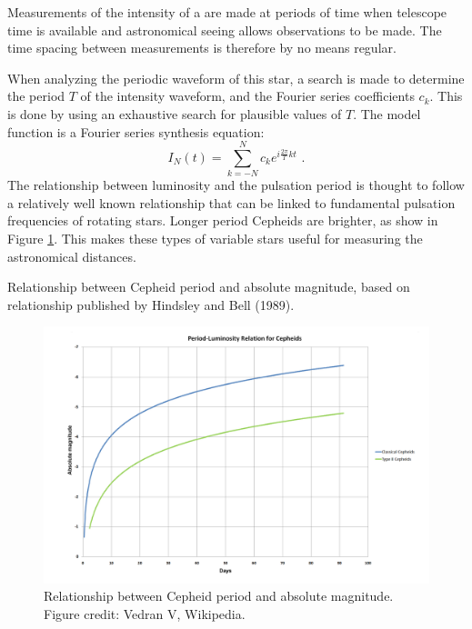 Measurements of the intensity of a \emph{} are made at periods of time when
telescope time is available and astronomical seeing allows
observations to be made. The time spacing between measurements is
therefore by no means regular.

When analyzing the periodic waveform of this star, a search is made to
determine the period $T$ of the intensity waveform, and the Fourier
series coefficients $c_k$. This is done by using an exhaustive search
for plausible values of $T$. The model function is a Fourier series
synthesis equation:
\begin{equation}
I_N(t) = \sum_{k=-N}^N c_k e^{i\frac{2\pi}{T}kt} \,\,.
\end{equation}
The relationship between luminosity and the pulsation period is
thought to follow a relatively well known relationship that can be
linked to fundamental pulsation frequencies of rotating
stars\cite{hindsley1989period}. Longer period Cepheids are brighter,
as show in Figure \ref{fig:ceph_bright}. This makes these types of
variable stars useful for measuring the astronomical distances.

\begin{marginfigure}
  \begin{center}
  \end{center}
  \caption{Relationship between Cepheid period and absolute magnitude, based on relationship published by Hindsley and Bell (1989).}
  \label{fig:ceph_bright}
\end{marginfigure}

\begin{figure}
\includegraphics[width=\textwidth]{Applications/figures/ceph_brightness.png}
\caption{Relationship between Cepheid period and absolute magnitude. Figure credit: Vedran V, Wikipedia.}
\label{fig:ceph_bright}
\end{figure}
\fi

